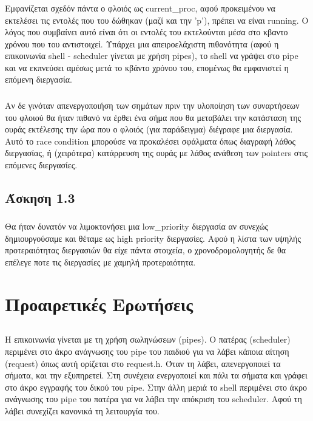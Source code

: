 \documentclass[a4paper,10pt]{article} \usepackage{anysize}
\begin{document}
\subsubsection{}
Εμφανίζεται σχεδόν πάντα ο φλοιός ως current\_proc, αφού προκειμένου να
εκτελέσει τις εντολές που του δώθηκαν (μαζί και την 'p'), πρέπει να είναι
running. Ο λόγος που συμβαίνει αυτό είναι ότι οι εντολές του εκτελούνται
μέσα στο κβαντο χρόνου που του αντιστοιχεί. Υπάρχει μια απειροελάχιστη
πιθανότητα (αφού η επικοινωνία shell - scheduler γίνεται με χρήση pipes), το
shell να γράψει στο pipe και να εκπνεύσει αμέσως μετά το κβάντο χρόνου του,
επομένως θα εμφανιστεί η επόμενη διεργασία.
\subsubsection{}
Αν δε γινόταν απενεργοποιήση των σημάτων πριν την υλοποίηση των συναρτήσεων
του φλοιού θα ήταν πιθανό να έρθει ένα σήμα που θα μεταβάλει την κατάσταση της
ουράς εκτέλεσης την ώρα που ο φλοιός (για παράδειγμα) διέγραφε μια διεργασία.
Αυτό το race condition μπορούσε να προκαλέσει σφάλματα όπως διαγραφή λάθος
διεργασίας, ή (χειρότερα) κατάρρευση της ουράς με λάθος ανάθεση των pointers
στις επόμενες διεργασίες.

\subsection{Άσκηση 1.3}
\subsubsection{}
Θα ήταν δυνατόν να λιμοκτονήσει μια low\_priority διεργασία αν συνεχώς
δημιουργούσαμε και θέταμε ως high priority διεργασίες. Αφού η λίστα των υψηλής
προτεραιότητας διεργασιών θα είχε πάντα στοιχεία, ο χρονοδρομολογητής δε θα
επέλεγε ποτε τις διεργασίες με χαμηλή προτεραιότητα.

\section*{Προαιρετικές Ερωτήσεις}
\setcounter{section}{4}
\setcounter{subsection}{0}
\subsection{}
Η επικοινωνία γίνεται με τη χρήση σωληνώσεων (pipes). Ο πατέρας (scheduler)
περιμένει στο άκρο ανάγνωσης του pipe του παιδιού για να λάβει κάποια αίτηση
(request) όπως αυτή ορίζεται στο request.h. Όταν τη λάβει, απενεργοποιεί τα σήματα,
και την εξυπηρετεί. Στη συνέχεια ενεργοποιεί και πάλι τα σήματα και γράφει στο άκρο
εγγραφής του δικού του pipe. Στην άλλη μεριά το shell περιμένει στο άκρο
ανάγνωσης του pipe του πατέρα για να λάβει την απόκριση του scheduler.
Αφού τη λάβει συνεχίζει κανονικά τη λειτουργία του.
\end{document}
